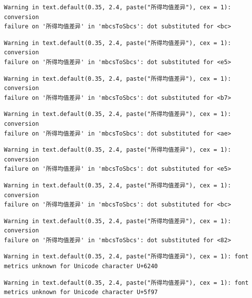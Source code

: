 \documentclass[
  letterpaper,
  DIV=11,
  numbers=noendperiod]{scrreprt}
\begin{document}
\begin{verbatim}
Warning in text.default(0.35, 2.4, paste("所得均值差异"), cex = 1): conversion
failure on '所得均值差异' in 'mbcsToSbcs': dot substituted for <bc>
\end{verbatim}

\begin{verbatim}
Warning in text.default(0.35, 2.4, paste("所得均值差异"), cex = 1): conversion
failure on '所得均值差异' in 'mbcsToSbcs': dot substituted for <e5>
\end{verbatim}

\begin{verbatim}
Warning in text.default(0.35, 2.4, paste("所得均值差异"), cex = 1): conversion
failure on '所得均值差异' in 'mbcsToSbcs': dot substituted for <b7>
\end{verbatim}

\begin{verbatim}
Warning in text.default(0.35, 2.4, paste("所得均值差异"), cex = 1): conversion
failure on '所得均值差异' in 'mbcsToSbcs': dot substituted for <ae>
\end{verbatim}

\begin{verbatim}
Warning in text.default(0.35, 2.4, paste("所得均值差异"), cex = 1): conversion
failure on '所得均值差异' in 'mbcsToSbcs': dot substituted for <e5>
\end{verbatim}

\begin{verbatim}
Warning in text.default(0.35, 2.4, paste("所得均值差异"), cex = 1): conversion
failure on '所得均值差异' in 'mbcsToSbcs': dot substituted for <bc>
\end{verbatim}

\begin{verbatim}
Warning in text.default(0.35, 2.4, paste("所得均值差异"), cex = 1): conversion
failure on '所得均值差异' in 'mbcsToSbcs': dot substituted for <82>
\end{verbatim}

\begin{verbatim}
Warning in text.default(0.35, 2.4, paste("所得均值差异"), cex = 1): font
metrics unknown for Unicode character U+6240
\end{verbatim}

\begin{verbatim}
Warning in text.default(0.35, 2.4, paste("所得均值差异"), cex = 1): font
metrics unknown for Unicode character U+5f97
\end{verbatim}
\end{document}
